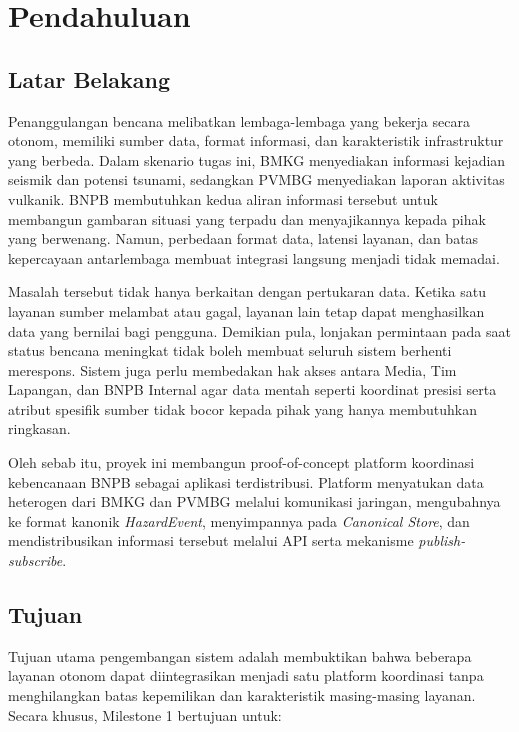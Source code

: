 \section{Pendahuluan}
\label{sec:pendahuluan}

\subsection{Latar Belakang}

Penanggulangan bencana melibatkan lembaga-lembaga yang bekerja secara otonom,
memiliki sumber data, format informasi, dan karakteristik infrastruktur yang
berbeda. Dalam skenario tugas ini, BMKG menyediakan informasi kejadian seismik
dan potensi tsunami, sedangkan PVMBG menyediakan laporan aktivitas vulkanik.
BNPB membutuhkan kedua aliran informasi tersebut untuk membangun gambaran
situasi yang terpadu dan menyajikannya kepada pihak yang berwenang. Namun,
perbedaan format data, latensi layanan, dan batas kepercayaan antarlembaga
membuat integrasi langsung menjadi tidak memadai.

Masalah tersebut tidak hanya berkaitan dengan pertukaran data. Ketika satu
layanan sumber melambat atau gagal, layanan lain tetap dapat menghasilkan data
yang bernilai bagi pengguna. Demikian pula, lonjakan permintaan pada saat status
bencana meningkat tidak boleh membuat seluruh sistem berhenti merespons.
Sistem juga perlu membedakan hak akses antara Media, Tim Lapangan, dan BNPB
Internal agar data mentah seperti koordinat presisi serta atribut spesifik sumber
tidak bocor kepada pihak yang hanya membutuhkan ringkasan.

Oleh sebab itu, proyek ini membangun proof-of-concept platform koordinasi
kebencanaan BNPB sebagai aplikasi terdistribusi. Platform menyatukan data
heterogen dari BMKG dan PVMBG melalui komunikasi jaringan, mengubahnya ke
format kanonik \textit{HazardEvent}, menyimpannya pada \textit{Canonical Store},
dan mendistribusikan informasi tersebut melalui API serta mekanisme
\textit{publish-subscribe}.

\subsection{Tujuan}

Tujuan utama pengembangan sistem adalah membuktikan bahwa beberapa layanan
otonom dapat diintegrasikan menjadi satu platform koordinasi tanpa menghilangkan
batas kepemilikan dan karakteristik masing-masing layanan. Secara khusus,
Milestone 1 bertujuan untuk:

